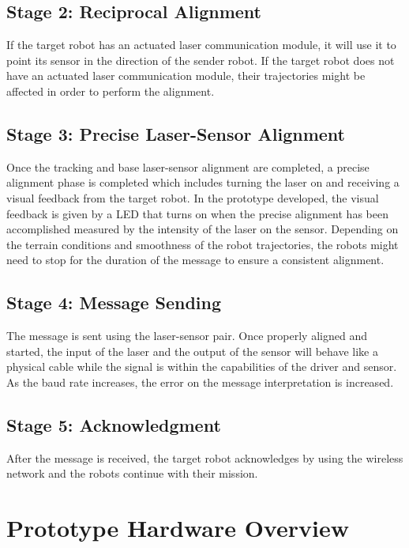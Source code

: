 \documentclass[botnum, fleqn]{unmeethesis}
\begin{document}
\subsection*{Stage 2: Reciprocal Alignment}

If the target robot has an actuated laser communication module, it will use it to point its sensor in the direction of the sender robot. If the target robot does not have an actuated laser communication module, their trajectories might be affected in order to perform the alignment. 

\subsection*{Stage 3: Precise Laser-Sensor Alignment}

Once the tracking and base laser-sensor alignment are completed, a precise alignment phase is completed which includes turning the laser on and receiving a visual feedback from the target robot. In the prototype developed, the visual feedback is given by a LED that turns on when the precise alignment has been accomplished measured by the intensity of the laser on the sensor. Depending on the terrain conditions and smoothness of the robot trajectories, the robots might need to stop for the duration of the message to ensure a consistent alignment.

\subsection*{Stage 4: Message Sending}

The message is sent using the laser-sensor pair. Once properly aligned and started, the input of the laser and the output of the sensor will behave like a physical cable while the signal is within the capabilities of the driver and sensor. As the baud rate increases, the error on the message interpretation is increased.

\subsection*{Stage 5: Acknowledgment}

After the message is received, the target robot acknowledges by using the wireless network and the robots continue with their mission.

\section*{Prototype Hardware Overview}\label{chp:}
\end{document}
